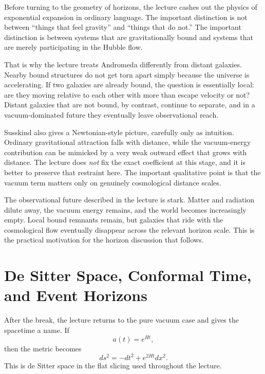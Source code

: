Before turning to the geometry of horizons, the lecture cashes out the physics of exponential expansion in ordinary language. The important distinction is not between ``things that feel gravity'' and ``things that do not.'' The important distinction is between systems that are gravitationally bound and systems that are merely participating in the Hubble flow.

That is why the lecture treats Andromeda differently from distant galaxies. Nearby bound structures do not get torn apart simply because the universe is accelerating. If two galaxies are already bound, the question is essentially local: are they moving relative to each other with more than escape velocity or not? Distant galaxies that are not bound, by contrast, continue to separate, and in a vacuum-dominated future they eventually leave observational reach.

Susskind also gives a Newtonian-style picture, carefully only as intuition. Ordinary gravitational attraction falls with distance, while the vacuum-energy contribution can be mimicked by a very weak outward effect that grows with distance. The lecture does \emph{not} fix the exact coefficient at this stage, and it is better to preserve that restraint here. The important qualitative point is that the vacuum term matters only on genuinely cosmological distance scales.

The observational future described in the lecture is stark. Matter and radiation dilute away, the vacuum energy remains, and the world becomes increasingly empty. Local bound remnants remain, but galaxies that ride with the cosmological flow eventually disappear across the relevant horizon scale. This is the practical motivation for the horizon discussion that follows.

\section{De Sitter Space, Conformal Time, and Event Horizons}

After the break, the lecture returns to the pure vacuum case and gives the spacetime a name. If
\begin{equation}
a(t)=e^{Ht},
\end{equation}
then the metric becomes
\begin{equation}
ds^2=-dt^2+e^{2Ht}dx^2.
\end{equation}
This is de Sitter space in the flat slicing used throughout the lecture.

